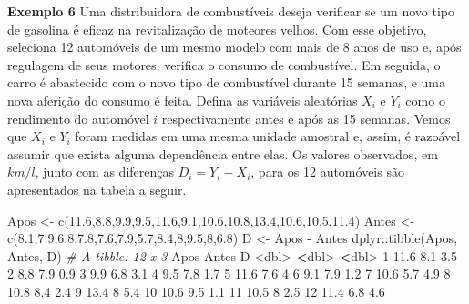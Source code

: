 \documentclass[
  10pt,
  a4paper]{book}
\newenvironment{Shaded}{\begin{snugshade}}{\end{snugshade}}
\newcommand{\CommentTok}[1]{\textcolor[rgb]{0.56,0.35,0.01}{\textit{#1}}}
\newcommand{\DecValTok}[1]{\textcolor[rgb]{0.00,0.00,0.81}{#1}}
\newcommand{\ErrorTok}[1]{\textcolor[rgb]{0.64,0.00,0.00}{\textbf{#1}}}
\newcommand{\FloatTok}[1]{\textcolor[rgb]{0.00,0.00,0.81}{#1}}
\newcommand{\FunctionTok}[1]{\textcolor[rgb]{0.00,0.00,0.00}{#1}}
\newcommand{\NormalTok}[1]{#1}
\newcommand{\OtherTok}[1]{\textcolor[rgb]{0.56,0.35,0.01}{#1}}
\newcommand{\SpecialCharTok}[1]{\textcolor[rgb]{0.00,0.00,0.00}{#1}}
\begin{document}
\textbf{Exemplo 6} Uma distribuidora de combustíveis deseja verificar se um novo tipo de gasolina é eficaz na revitalização de moteores velhos. Com esse objetivo, seleciona 12 automóveis de um mesmo modelo com mais de 8 anos de uso e, após regulagem de seus motores, verifica o consumo de combustível. Em seguida, o carro é abastecido com o novo tipo de combustível durante 15 semanas, e uma nova aferição do consumo é feita. Defina as variáveis aleatórias \(X_i\) e \(Y_i\) como o rendimento do automóvel \(i\) respectivamente antes e após as 15 semanas. Vemos que \(X_i\) e \(Y_i\) foram medidas em uma mesma unidade amostral e, assim, é razoável assumir que exista alguma dependência entre elas. Os valores observados, em \(km/l\), junto com as diferenças \(D_i = Y_i - X_i\), para os 12 automóveis são apresentados na tabela a seguir.

\begin{Shaded}
\begin{Highlighting}[]
\NormalTok{Apos }\OtherTok{\textless{}{-}} \FunctionTok{c}\NormalTok{(}\FloatTok{11.6}\NormalTok{,}\FloatTok{8.8}\NormalTok{,}\FloatTok{9.9}\NormalTok{,}\FloatTok{9.5}\NormalTok{,}\FloatTok{11.6}\NormalTok{,}\FloatTok{9.1}\NormalTok{,}\FloatTok{10.6}\NormalTok{,}\FloatTok{10.8}\NormalTok{,}\FloatTok{13.4}\NormalTok{,}\FloatTok{10.6}\NormalTok{,}\FloatTok{10.5}\NormalTok{,}\FloatTok{11.4}\NormalTok{)}
\NormalTok{Antes }\OtherTok{\textless{}{-}} \FunctionTok{c}\NormalTok{(}\FloatTok{8.1}\NormalTok{,}\FloatTok{7.9}\NormalTok{,}\FloatTok{6.8}\NormalTok{,}\FloatTok{7.8}\NormalTok{,}\FloatTok{7.6}\NormalTok{,}\FloatTok{7.9}\NormalTok{,}\FloatTok{5.7}\NormalTok{,}\FloatTok{8.4}\NormalTok{,}\DecValTok{8}\NormalTok{,}\FloatTok{9.5}\NormalTok{,}\DecValTok{8}\NormalTok{,}\FloatTok{6.8}\NormalTok{)}
\NormalTok{D }\OtherTok{\textless{}{-}}\NormalTok{ Apos }\SpecialCharTok{{-}}\NormalTok{ Antes}
\NormalTok{dplyr}\SpecialCharTok{::}\FunctionTok{tibble}\NormalTok{(Apos, Antes, D)}
\CommentTok{\# A tibble: 12 x 3}
\NormalTok{    Apos Antes     D}
   \SpecialCharTok{\textless{}}\NormalTok{dbl}\SpecialCharTok{\textgreater{}} \ErrorTok{\textless{}}\NormalTok{dbl}\SpecialCharTok{\textgreater{}} \ErrorTok{\textless{}}\NormalTok{dbl}\SpecialCharTok{\textgreater{}}
 \DecValTok{1}  \FloatTok{11.6}   \FloatTok{8.1}   \FloatTok{3.5}
 \DecValTok{2}   \FloatTok{8.8}   \FloatTok{7.9}   \FloatTok{0.9}
 \DecValTok{3}   \FloatTok{9.9}   \FloatTok{6.8}   \FloatTok{3.1}
 \DecValTok{4}   \FloatTok{9.5}   \FloatTok{7.8}   \FloatTok{1.7}
 \DecValTok{5}  \FloatTok{11.6}   \FloatTok{7.6}   \DecValTok{4}  
 \DecValTok{6}   \FloatTok{9.1}   \FloatTok{7.9}   \FloatTok{1.2}
 \DecValTok{7}  \FloatTok{10.6}   \FloatTok{5.7}   \FloatTok{4.9}
 \DecValTok{8}  \FloatTok{10.8}   \FloatTok{8.4}   \FloatTok{2.4}
 \DecValTok{9}  \FloatTok{13.4}   \DecValTok{8}     \FloatTok{5.4}
\DecValTok{10}  \FloatTok{10.6}   \FloatTok{9.5}   \FloatTok{1.1}
\DecValTok{11}  \FloatTok{10.5}   \DecValTok{8}     \FloatTok{2.5}
\DecValTok{12}  \FloatTok{11.4}   \FloatTok{6.8}   \FloatTok{4.6}
\end{Highlighting}
\end{Shaded}
\end{document}
